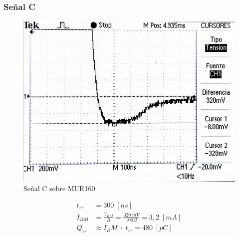 \documentclass{article}
\begin{document}
\subsubsection{Señal C}
\begin{figure}[h]
 \begin{center}
	\includegraphics[scale=0.5]{imagenes/MUR_C.jpg} 
	\caption{Señal C sobre MUR160}
 \end{center}
\end{figure}
%
\begin{align*}
	t_{rr} &= 300 \; [ns] \\
	I_{RM}	&= \frac{V_{RM}}{R} = \frac{320 \; mV}{100 \Omega} = 3,2 \; [mA] \\
	Q_{rr}	&\approx {I_RM} \; \cdot \; t_{rr} = 480 \; [pC]
\end{align*}
%
\end{document}
